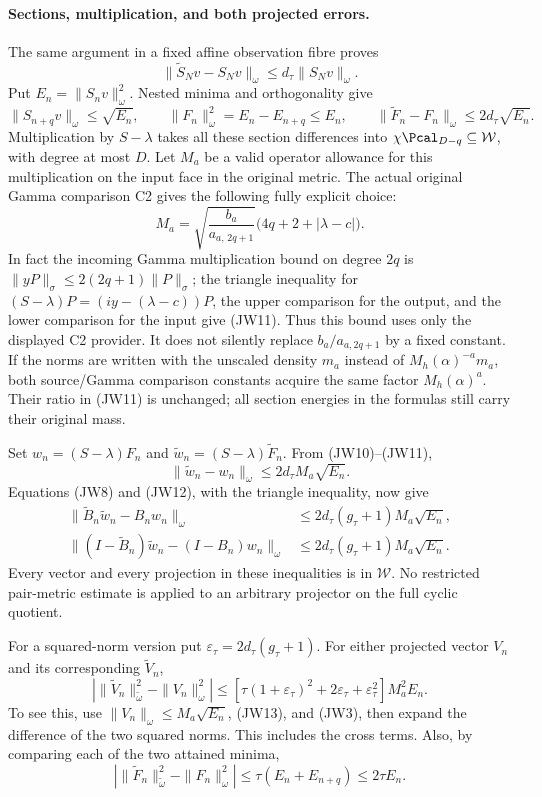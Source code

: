 \documentclass[11pt,a4paper]{article}
\begin{document}
\paragraph{Sections, multiplication, and both projected errors.}
The same argument in a fixed affine observation fibre proves
\[
\|\widetilde S_Nv-S_Nv\|_\omega
\le d_\tau\|S_Nv\|_\omega.
\tag{JW9}
\]
Put \(E_n=\|S_nv\|_\omega^2\).
Nested minima and orthogonality give
\[
\|S_{n+q}v\|_\omega\le\sqrt{E_n},\qquad
\|F_n\|_\omega^2=E_n-E_{n+q}\le E_n,\qquad
\|\widetilde F_n-F_n\|_\omega\le2d_\tau\sqrt{E_n}.
\tag{JW10}
\]
Multiplication by \(S-\lambda\) takes all these section differences
into \(\chi\Pcal_{D-q}\subseteq\mathcal W\), with degree at most \(D\).
Let \(M_a\) be a valid operator allowance for this multiplication on
the input face in the original metric.  The actual original
Gamma comparison C2 gives the following fully explicit choice:
\[
M_a=
\sqrt{\frac{b_a}{a_{a,\,2q+1}}}
\bigl(4q+2+|\lambda-c|\bigr).
\tag{JW11}
\]
In fact the incoming Gamma multiplication bound on degree \(2q\)
is \(\|yP\|_\sigma\le2(2q+1)\|P\|_\sigma\);
the triangle inequality for
\((S-\lambda)P=(iy-(\lambda-c))P\), the upper comparison for the output,
and the lower comparison for the input give (JW11).
Thus this bound uses only the displayed C2 provider.  It does not
silently replace \(b_a/a_{a,2q+1}\) by a fixed constant.
If the norms are written with the unscaled density \(m_a\) instead of
\(M_h(\alpha)^{-a}m_a\), both source/Gamma comparison constants acquire
the same factor \(M_h(\alpha)^a\).  Their ratio in (JW11) is unchanged;
all section energies in the formulas still carry their original mass.

Set \(w_n=(S-\lambda)F_n\) and
\(\widetilde w_n=(S-\lambda)\widetilde F_n\).  From (JW10)--(JW11),
\[
\|\widetilde w_n-w_n\|_\omega
\le2d_\tau M_a\sqrt{E_n}.
\tag{JW12}
\]
Equations (JW8) and (JW12), with the triangle inequality, now give
\[
\begin{split}
\|\widetilde B_n\widetilde w_n-B_nw_n\|_\omega
&\le2d_\tau(g_\tau+1)M_a\sqrt{E_n},\\
\|(I-\widetilde B_n)\widetilde w_n-(I-B_n)w_n\|_\omega
&\le2d_\tau(g_\tau+1)M_a\sqrt{E_n}.
\end{split}
\tag{JW13}
\]
Every vector and every projection in these inequalities is in
\(\mathcal W\).  No restricted pair-metric estimate is applied to
an arbitrary projector on the full cyclic quotient.

For a squared-norm version put
\(\varepsilon_\tau=2d_\tau(g_\tau+1)\).
For either projected vector \(V_n\) and its corresponding
\(\widetilde V_n\),
\[
\left|\|\widetilde V_n\|_{\widetilde\omega}^2
              -\|V_n\|_\omega^2\right|
\le
\left[\tau(1+\varepsilon_\tau)^2
      +2\varepsilon_\tau+\varepsilon_\tau^2\right]M_a^2E_n.
\tag{JW14}
\]
To see this, use \(\|V_n\|_\omega\le M_a\sqrt{E_n}\),
(JW13), and (JW3), then expand the difference of the two squared
norms.  This includes the cross terms.
Also, by comparing each of the two attained minima,
\[
\left|\|\widetilde F_n\|_{\widetilde\omega}^2
              -\|F_n\|_\omega^2\right|
\le\tau(E_n+E_{n+q})\le2\tau E_n.
\tag{JW15}
\]
\end{document}
